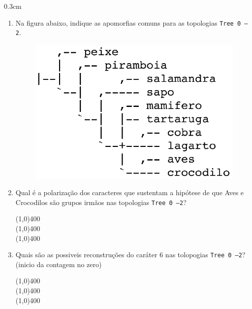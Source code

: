 \begin{refsection}
  \begin {myindentpar}{0.3cm}
  \begin{enumerate}[\itshape i.]
	\item{Na figura abaixo, indique as apomorfias comuns para as topologias \texttt{Tree 0 --2}.}
  \begin{figure}[H]
      {\includegraphics[scale=1.00]{figures/tut5/vertebrados_trees_consenso.eps}}\label{tut5:fig:apo_common} 
  \end{figure}

	\item{Qual é a polarização dos caracteres que sustentam a hipótese de que Aves e Crocodilos são grupos irmãos nas topologias \texttt{Tree 0 --2}?}

	   \line(1,0){400}\\
	   \line(1,0){400}\\
	   \line(1,0){400}\\

	\item{Quais são as possiveis reconstruções do caráter 6 nas tolopogias \texttt{Tree 0 --2}? (inicio da contagem no zero)}

	   \line(1,0){400}\\
	   \line(1,0){400}\\
	   \line(1,0){400}\\


\end{enumerate}
\end{myindentpar}
\end{refsection}
